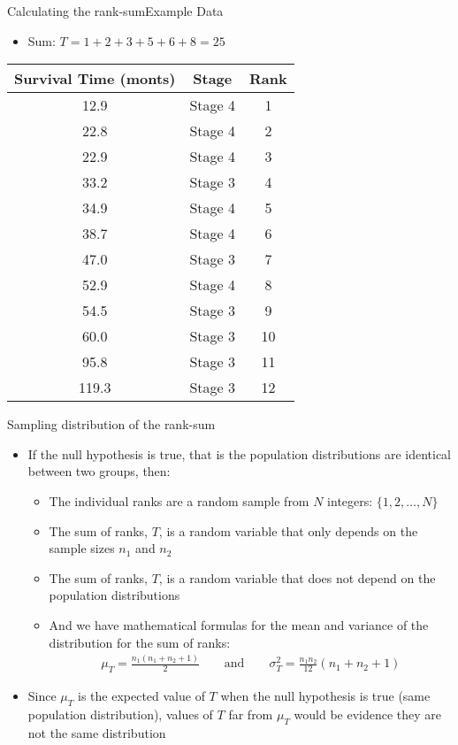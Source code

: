 \documentclass[xcolor=dvipsnames]{beamer}
\begin{document}
\begin{frame}{Calculating the rank-sum}{Example Data}
\begin{itemize}
	\item Sum: $T = 1 + 2 + 3 + 5 + 6 + 8 = 25$
\end{itemize}
\begin{center}
	\begin{tabular}{|c|c|c|}
		\hline
		\textbf{Survival Time (monts)} &  \textbf{Stage} & \textbf{Rank}\\ \hline \hline
		12.9 &Stage 4 & 1 \\ \hline
		22.8 &Stage 4 & 2\\ \hline
		22.9& Stage 4 & 3\\ \hline
		33.2 &Stage 3 & 4\\ \hline
		34.9& Stage 4 & 5\\ \hline
		38.7 &Stage 4 & 6\\ \hline
		47.0 &Stage 3 & 7\\ \hline		
		52.9  &Stage 4 & 8\\ \hline
		54.5 &Stage 3 & 9\\ \hline				
		60.0 &Stage 3 & 10\\ \hline
		95.8& Stage 3 & 11\\ \hline
		119.3 &Stage 3 & 12\\ \hline
	\end{tabular}
\end{center}
\end{frame}

\begin{frame}{Sampling distribution of the rank-sum}
	\begin{itemize}
		\item If the null hypothesis is true, that is the population distributions are identical between two groups, then:
		\begin{itemize}
			\item The individual ranks are a random sample from $N$ integers: $\{1, 2, \hdots, N\}$
			\item The sum of ranks, $T$, is a random variable that only depends on the sample sizes $n_1$ and $n_2$
			\item The sum of ranks, $T$, is a random variable that does not depend on the population distributions
			\item And we have mathematical formulas for the mean and variance of the distribution for the sum of ranks:
			\begin{gather*}
			\mu_T = \frac{n_1 (n_1 + n_2 + 1)}{2} \quad \quad \text{and} \quad \quad \sigma_T^{2} = \frac{n_1 n_2}{12}(n_1 +n_2 +1)
			\end{gather*}
		\end{itemize}
	\item Since $\mu_T$ is the expected value of $T$ when the null hypothesis is true (same population distribution), values of $T$ far from $\mu_T$ would be evidence they are not the same distribution
	\end{itemize}
\end{frame}
\end{document}
